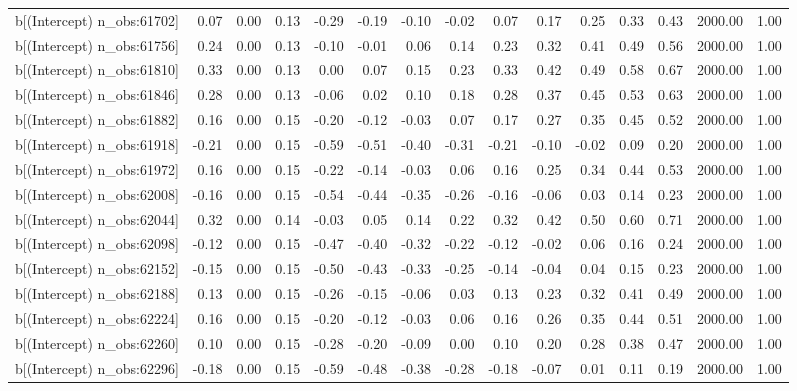\begin{table}[ht]
\begin{tabular}{rrrrrrrrrrrrrrr}
  b[(Intercept) n\_obs:61702] & 0.07 & 0.00 & 0.13 & -0.29 & -0.19 & -0.10 & -0.02 & 0.07 & 0.17 & 0.25 & 0.33 & 0.43 & 2000.00 & 1.00 \\ 
  b[(Intercept) n\_obs:61756] & 0.24 & 0.00 & 0.13 & -0.10 & -0.01 & 0.06 & 0.14 & 0.23 & 0.32 & 0.41 & 0.49 & 0.56 & 2000.00 & 1.00 \\ 
  b[(Intercept) n\_obs:61810] & 0.33 & 0.00 & 0.13 & 0.00 & 0.07 & 0.15 & 0.23 & 0.33 & 0.42 & 0.49 & 0.58 & 0.67 & 2000.00 & 1.00 \\ 
  b[(Intercept) n\_obs:61846] & 0.28 & 0.00 & 0.13 & -0.06 & 0.02 & 0.10 & 0.18 & 0.28 & 0.37 & 0.45 & 0.53 & 0.63 & 2000.00 & 1.00 \\ 
  b[(Intercept) n\_obs:61882] & 0.16 & 0.00 & 0.15 & -0.20 & -0.12 & -0.03 & 0.07 & 0.17 & 0.27 & 0.35 & 0.45 & 0.52 & 2000.00 & 1.00 \\ 
  b[(Intercept) n\_obs:61918] & -0.21 & 0.00 & 0.15 & -0.59 & -0.51 & -0.40 & -0.31 & -0.21 & -0.10 & -0.02 & 0.09 & 0.20 & 2000.00 & 1.00 \\ 
  b[(Intercept) n\_obs:61972] & 0.16 & 0.00 & 0.15 & -0.22 & -0.14 & -0.03 & 0.06 & 0.16 & 0.25 & 0.34 & 0.44 & 0.53 & 2000.00 & 1.00 \\ 
  b[(Intercept) n\_obs:62008] & -0.16 & 0.00 & 0.15 & -0.54 & -0.44 & -0.35 & -0.26 & -0.16 & -0.06 & 0.03 & 0.14 & 0.23 & 2000.00 & 1.00 \\ 
  b[(Intercept) n\_obs:62044] & 0.32 & 0.00 & 0.14 & -0.03 & 0.05 & 0.14 & 0.22 & 0.32 & 0.42 & 0.50 & 0.60 & 0.71 & 2000.00 & 1.00 \\ 
  b[(Intercept) n\_obs:62098] & -0.12 & 0.00 & 0.15 & -0.47 & -0.40 & -0.32 & -0.22 & -0.12 & -0.02 & 0.06 & 0.16 & 0.24 & 2000.00 & 1.00 \\ 
  b[(Intercept) n\_obs:62152] & -0.15 & 0.00 & 0.15 & -0.50 & -0.43 & -0.33 & -0.25 & -0.14 & -0.04 & 0.04 & 0.15 & 0.23 & 2000.00 & 1.00 \\ 
  b[(Intercept) n\_obs:62188] & 0.13 & 0.00 & 0.15 & -0.26 & -0.15 & -0.06 & 0.03 & 0.13 & 0.23 & 0.32 & 0.41 & 0.49 & 2000.00 & 1.00 \\ 
  b[(Intercept) n\_obs:62224] & 0.16 & 0.00 & 0.15 & -0.20 & -0.12 & -0.03 & 0.06 & 0.16 & 0.26 & 0.35 & 0.44 & 0.51 & 2000.00 & 1.00 \\ 
  b[(Intercept) n\_obs:62260] & 0.10 & 0.00 & 0.15 & -0.28 & -0.20 & -0.09 & 0.00 & 0.10 & 0.20 & 0.28 & 0.38 & 0.47 & 2000.00 & 1.00 \\ 
  b[(Intercept) n\_obs:62296] & -0.18 & 0.00 & 0.15 & -0.59 & -0.48 & -0.38 & -0.28 & -0.18 & -0.07 & 0.01 & 0.11 & 0.19 & 2000.00 & 1.00 \\ 

\end{tabular}
\end{table}

